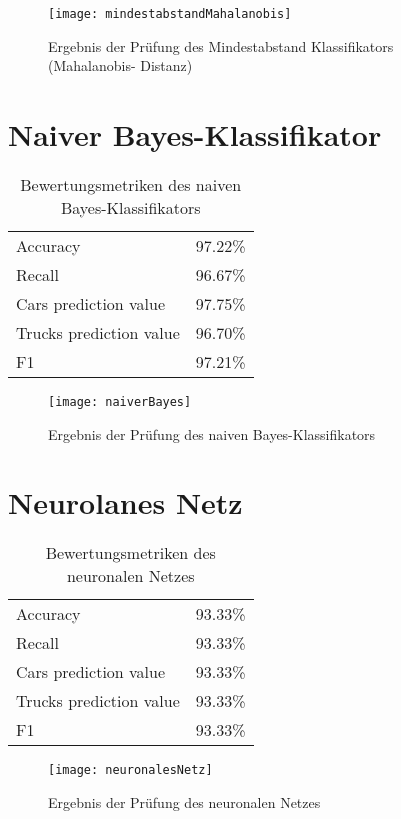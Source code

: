 \begin{figure}[ht]
\centering
\texttt{[image: mindestabstandMahalanobis]}
\caption{Ergebnis der Pr\"ufung des Mindestabstand Klassifikators (Mahalanobis-%
Distanz)}
\label{fig:mahalanobis}
\end{figure}

\section{Naiver Bayes-Klassifikator}

\begin{table}[ht]
\centering
\begin{tabular}{| l | r |}
    \hline
    Accuracy                & 97.22\% \\
    Recall                  & 96.67\% \\
    Cars prediction value   & 97.75\% \\
    Trucks prediction value & 96.70\% \\
    F1                      & 97.21\% \\
    \hline
\end{tabular}
\caption{Bewertungsmetriken des naiven Bayes-Klassifikators}
\label{tab:bayes}
\end{table}

\begin{figure}[ht]
\centering
\texttt{[image: naiverBayes]}
\caption{Ergebnis der Pr\"ufung des naiven Bayes-Klassifikators}
\label{fig:bayes}
\end{figure}

\section{Neurolanes Netz}

\begin{table}[ht]
\centering
\begin{tabular}{| l | r |}
    \hline
    Accuracy                & 93.33\% \\
    Recall                  & 93.33\% \\
    Cars prediction value   & 93.33\% \\
    Trucks prediction value & 93.33\% \\
    F1                      & 93.33\% \\
    \hline
\end{tabular}
\caption{Bewertungsmetriken des neuronalen Netzes}
\label{tab:netz}
\end{table}

\begin{figure}[ht]
\centering
\texttt{[image: neuronalesNetz]}
\caption{Ergebnis der Pr\"ufung des neuronalen Netzes}
\label{fig:netz}
\end{figure}